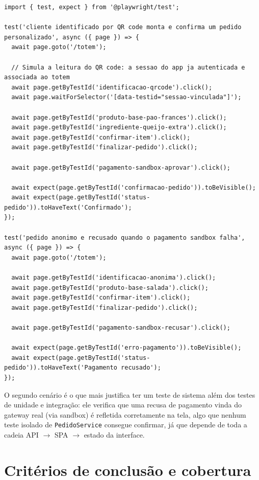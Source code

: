 \documentclass[a4paper,12pt,oneside,openany]{book}
\begin{document}
\begin{lstlisting}[caption={Cenários de teste de sistema em Playwright cobrindo a rota de QR code e a rota de pagamento recusado.}]
import { test, expect } from '@playwright/test';

test('cliente identificado por QR code monta e confirma um pedido personalizado', async ({ page }) => {
  await page.goto('/totem');

  // Simula a leitura do QR code: a sessao do app ja autenticada e associada ao totem
  await page.getByTestId('identificacao-qrcode').click();
  await page.waitForSelector('[data-testid="sessao-vinculada"]');

  await page.getByTestId('produto-base-pao-frances').click();
  await page.getByTestId('ingrediente-queijo-extra').click();
  await page.getByTestId('confirmar-item').click();
  await page.getByTestId('finalizar-pedido').click();

  await page.getByTestId('pagamento-sandbox-aprovar').click();

  await expect(page.getByTestId('confirmacao-pedido')).toBeVisible();
  await expect(page.getByTestId('status-pedido')).toHaveText('Confirmado');
});

test('pedido anonimo e recusado quando o pagamento sandbox falha', async ({ page }) => {
  await page.goto('/totem');

  await page.getByTestId('identificacao-anonima').click();
  await page.getByTestId('produto-base-salada').click();
  await page.getByTestId('confirmar-item').click();
  await page.getByTestId('finalizar-pedido').click();

  await page.getByTestId('pagamento-sandbox-recusar').click();

  await expect(page.getByTestId('erro-pagamento')).toBeVisible();
  await expect(page.getByTestId('status-pedido')).toHaveText('Pagamento recusado');
});
\end{lstlisting}

O segundo cenário é o que mais justifica ter um teste de sistema além dos testes de unidade e integração: ele verifica que uma recusa de pagamento vinda do gateway real (via sandbox) é refletida corretamente na tela, algo que nenhum teste isolado de \texttt{PedidoService} consegue confirmar, já que depende de toda a cadeia API $\rightarrow$ SPA $\rightarrow$ estado da interface.

\section{Critérios de conclusão e cobertura}
\end{document}
